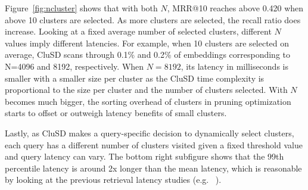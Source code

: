 Figure~\ref{fig:ncluster} shows that with both $N$,
MRR@10 reaches above 0.420 when above 10 clusters 
are selected.
As more clusters are selected,  the recall ratio does  increase. 
Looking at  a fixed average number of selected clusters, 
different $N$ values imply different latencies.
For example, when 10 clusters are selected on average, 
CluSD  scans through 0.1\% and  0.2\% of embeddings corresponding to N=4096 and 8192, respectively. 
When $N= 8192$, its latency in milliseconds is smaller  with a  smaller size per cluster
as the CluSD time complexity is proportional  to  the size per cluster and the number of clusters selected.
With $N$ becomes much bigger,  the sorting overhead of clusters in pruning optimization starts to offset or outweigh latency benefits
of small clusters. 

Lastly, as CluSD makes a query-specific decision to dynamically select  clusters, each query has  a  different number of clusters visited
given a fixed threshold value and query latency can vary. 
The bottom right subfigure shows that the 99th percentile latency is around 2x longer than the mean latency, which is reasonable by
looking at the previous retrieval latency studies (e.g. ~\cite{mallia2019pisa, mackenzie2021anytime}). 




